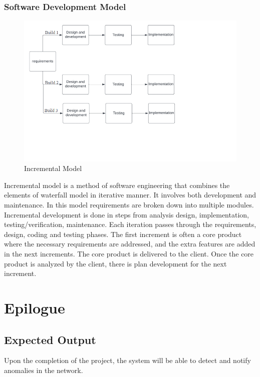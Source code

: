 \subsection{Software Development Model}
\vspace{-18pt}
 \begin{figure}[tbh] %
\begin{center}
	\includegraphics[width=6in]{images/sdlc1.png} 
	\caption{Incremental Model} %
	\label{Incremental Model} %
\end{center}
\end{figure}
Incremental model is a method of software engineering that combines the elements of waterfall model in iterative manner. It involves both development and maintenance. In this model requirements are broken down into multiple modules. Incremental development is done in steps from analysis design, implementation, testing/verification, maintenance. Each iteration passes through the requirements, design, coding and testing phases. The first increment is often a core product where the necessary requirements are addressed, and the extra features are added in the next increments. The core product is delivered to the client. Once the core product is analyzed by the client, there is plan development for the next increment.\\
\chapter{Epilogue}
\vspace{-18pt}
\section{Expected Output}
\vspace{-18pt}
Upon the completion of the project, the system will be able to detect and notify anomalies in the network.
\renewcommand\bibname{References} %

